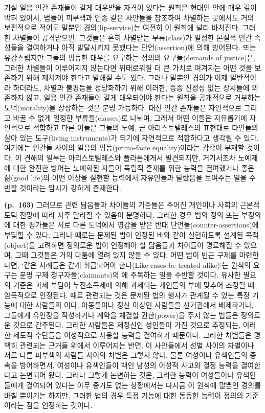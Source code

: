 기실 일응 인간 존재들이 같게 대우받을 자격이 있다는 원칙은 현대인 안에
매우 깊이 박혀 있어서, 법들이 피부색과 인종 같은 사안들을 참조하여
차별하는 곳에서도 거의 보편적으로 적어도 말뿐인 경의(lip-service)는
여전히 이 원칙에 널리 바쳐진다. 그러한 차별들이 공격받으면, 그것들은
흔히 차별받는 부류(class)가 일정한 본질적 인간 속성들을 결여하거나 아직
발달시키지 못했다는 단언(assertion)에 의해 방어된다. 또는 유감스럽지만
그들의 평등한 대우를 요구하는 정의의 요구들(demands of justice)은,
그러한 차별들이 이루어지지 않는다면 위태로워질 더 큰 가치로 여겨지는
어떤 것을 보존하기 위해 제쳐져야 한다고 말해질 수도 있다. 그러나 말뿐인
경의가 이제 일반적이라 하더라도, 차별과 불평등을 정당화하기 위해 이러한,
종종 진정성 없는 장치들에 의존하지 않고, 일응 인간 존재들이 같게
대우되어야 한다는 원칙을 공개적으로 거부하는 도덕(morality)을 상상하는
것은 분명 가능하다. 대신 인간 존재들은 자연적으로 그리고 바꿀 수 없게
일정한 부류들(classes)로 나뉘며, 그래서 어떤 이들은 자유롭기에
자연적으로 적합하고 다른 이들은 그들의 노예, 곧 아리스토텔레스의
표현대로 타인들의 살아 있는 도구(living instruments)가 되기에 자연적으로
적합하다고 생각될 수 있다. 여기에는 인간들 사이의 일응의
평등(prima-facie equality)이라는 감각이 부재할 것이다. 이 견해의 일부는
아리스토텔레스와 플라톤에게서 발견되지만, 거기서조차 노예제에 대한
완전한 방어는 노예화된 자들이 독립적 존재를 위한 능력을 결여했거나 좋은
삶(good life)의 어떤 이상을 실현할 능력에서 자유인들과 달랐음을 보여주는
일을 수반할 것이라는 암시가 강하게 존재한다.

\textbf{(p.~163)} 그러므로 관련 닮음들과 차이들의 기준들은 주어진
개인이나 사회의 근본적 도덕 전망에 따라 자주 달라질 수 있음이 분명하다.
그러한 경우 법의 정의 또는 부정의에 대한 평가들은 서로 다른 도덕에서
영감을 받은 반대 단언들(counter-assertions)에 부딪힐 수 있다. 그러나
때로는 문제된 법이 인정된 바와 같이 실현하도록 설계된 목적(object)을
고려하면 정의로운 법이 인정해야 할 닮음들과 차이들이 명료해질 수 있으며,
그때 그것들은 거의 다툼에 열려 있지 않을 수 있다. 어떤 법이 빈곤 구제를
마련한다면, ‘같은 사례들은 같게 취급되어야 한다(Like cases be treated
alike)’는 원칙의 요구는 분명 구제 청구자들(claimants)의
에 주목하는 일을 수반할 것이다. 유사한 필요의 기준은
과세 부담이 누진소득세에 의해 과세되는 개인들의 부에 맞추어 조정될 때
암묵적으로 인정된다. 때로 관련되는 것은 문제된 법의 행사가 관계될 수
있는 특정 기능에 대한 사람들의 이다. 아동들이나
정신 이상인 사람들을 선거권에서 배제하거나, 그들에게 유언장을 작성하거나
계약을 체결할 권한(power)을 주지 않는 법들은 정의로운 것으로 간주된다.
그러한 사람들은 제정신인 성인들이 가진 것으로 추정되는, 이러한 제도적
수단들을 이성적으로 사용할 능력을 결여하기 때문이다. 그러한 차별들은
명백히 관련되는 근거들 위에서 이루어지는 반면, 이 사안들에서 성별 사이의
차별이나 서로 다른 피부색의 사람들 사이의 차별은 그렇지 않다. 물론
여성이나 유색인들의 종속을 방어하면서, 여성이나 유색인들이 백인 남성의
이성적 사고와 결정 능력을 결여한다고 논변되어 왔다. 그러나 그렇게
논변하는 것은, 그러한 능력이 여성들이나 유색인들에게 결여되어 있다는
아무 증거도 없는 상황에서는 다시금 이 원칙에 말뿐인 경의를 바칠 뿐이기는
하지만, 그러한 법의 경우 특정 기능에 대한 동등한 능력이 정의의
기준이라는 점을 인정하는 것이다.

